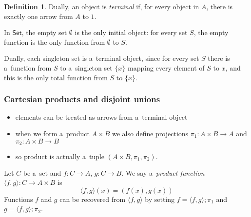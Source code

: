 \documentclass{amsart}
\theoremstyle{definition}
\newtheorem{definition}[thm]{Definition}
\newcommand{\cat}[1]{\mathsf{#1}} %
\begin{document}
\begin{definition}
Dually, an object is \emph{terminal} if, for every object in $A$, there is exactly one arrow from $A$ to $1$. 
\end{definition}

In $\cat{Set}$, the empty set $\emptyset$ is the only initial object: for every set $S$, the empty function is the only function from $\emptyset$ to $S$.

Dually, each singleton set is a~terminal object, since for every set $S$ there is a~function from $S$ to a~singleton set $\{x\}$ mapping every element of $S$ to $x$, and this is the only total function from $S$ to $\{x\}$. 

\subsubsection{Cartesian products and disjoint unions}

\begin{itemize}
\item elements can be treated as arrows from a~terminal object
\item when we form a~product $A\times B$ we also define projections $\pi_{1}: A\times B \to A$ and $\pi_{2}: A\times B \to B$
\item so product is actually a~tuple $(A\times B, \pi_{1},\pi_{2})$.
\end{itemize}

Let $C$ be a~set and $f: C\to A$, $g: C\to B$. We say a~\emph{product function} $\langle f,g\rangle: C \to A\times B$ is
\[
\langle f, g\rangle (x) = (f(x), g(x))
\]
Functions $f$ and $g$ can be recovered from $\langle f, g\rangle$ by setting $f = \langle f,g\rangle;\! \pi_{1}$ and $g = \langle f, g\rangle;\! \pi_{2}$.
\end{document}
